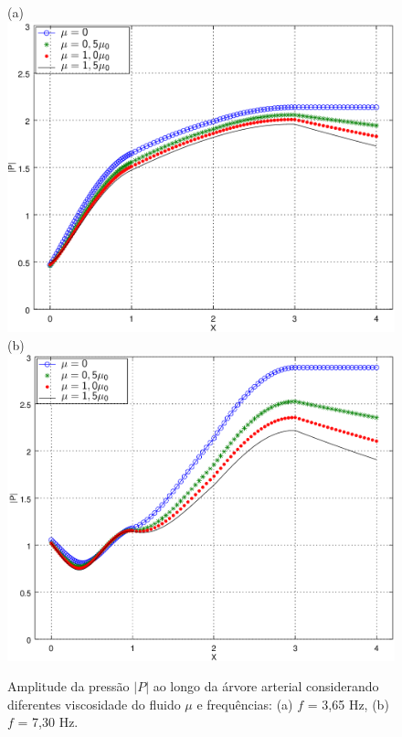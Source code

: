 \begin{figure}[!htbp]
	\centering
	(a) \\
	\includegraphics[scale=0.7]{Figures/fig3_P_f3_65_visc_NEW.png}\\
	(b)\\
	\includegraphics[scale=0.7]{Figures/fig3_P_f7_30_visc_NEW.png}\\
	\caption{Amplitude da pressão $|P|$ ao longo da árvore arterial considerando diferentes viscosidade do fluido $\mu$ e frequências: (a) $f$ = 3,65 Hz, (b)  $f$ = 7,30 Hz. }
	\label{fig3a:arterial-tree}%
\end{figure}

